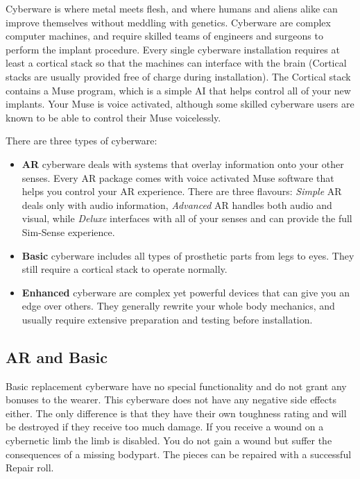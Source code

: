 \documentclass[10pt,twoside]{article}
\begin{document}
  \begin{multicols}{2}
  
  Cyberware is where metal meets flesh, and where humans and aliens alike can improve themselves without meddling with genetics. Cyberware are complex computer machines, and require skilled teams of engineers and surgeons to perform the implant procedure. Every single cyberware installation requires at least a cortical stack so that the machines can interface with the brain (Cortical stacks are usually provided free of charge during installation). The Cortical stack contains a Muse program, which is a simple AI that helps control all of your new implants. Your Muse is voice activated, although some skilled cyberware users are known to be able to control their Muse voicelessly.
  
  There are three types of cyberware: 
  
  \begin{itemize}
    \item \textbf{AR} cyberware deals with systems that overlay information onto your other senses. Every AR package comes with voice activated Muse software that helps you control your AR experience. There are three flavours: \textit{Simple} AR deals only with audio information, \textit{Advanced} AR handles both audio and visual, while \textit{Deluxe} interfaces with all of your senses and can provide the full Sim-Sense experience.
    \item \textbf{Basic} cyberware includes all types of prosthetic parts from legs to eyes. They still require a cortical stack to operate normally.
    \item \textbf{Enhanced} cyberware are complex yet powerful devices that can give you an edge over others. They generally rewrite your whole body mechanics, and usually require extensive preparation and testing before installation.
  \end{itemize}
  
  \subsection{AR and Basic}
  
  Basic replacement cyberware have no special functionality and do not grant any bonuses to the wearer. This cyberware does not have any negative side effects either. The only difference is that they have their own toughness rating and will be destroyed if they receive too much damage. If you receive a wound on a cybernetic limb the limb is disabled. You do not gain a wound but suffer the consequences of a missing bodypart. The pieces can be repaired with a successful Repair roll.
  

\end{multicols}
\end{document}
